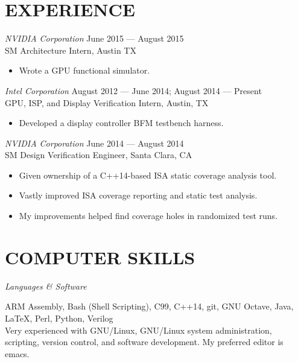 \documentclass[margin]{res}
\begin{document}
\begin{resume}
  \section{EXPERIENCE}
  {\sl NVIDIA Corporation}
  \hfill June 2015 --- August 2015 \\
  SM Architecture Intern, Austin TX
  \vspace{0.25em}
  \begin{itemize}
  \item Wrote a GPU functional simulator.
  \end{itemize}
  {\sl Intel Corporation}
  \hfill August 2012 --- June 2014; August 2014 --- Present \\
  GPU, ISP, and Display Verification Intern, Austin, TX
  \vspace{0.25em}
  \begin{itemize}
  \item Developed a display controller BFM testbench harness.
  \end{itemize}
  {\sl NVIDIA Corporation}
  \hfill June 2014 --- August 2014 \\
  SM Design Verification Engineer, Santa Clara, CA
  \vspace{0.25em}
  \begin{itemize}
  \item Given ownership of a C++14-based ISA static coverage analysis
    tool.
  \item Vastly improved ISA coverage reporting and static test
    analysis.
  \item My improvements helped find coverage holes in randomized test
    runs.
  \end{itemize}

  \section{COMPUTER SKILLS}
  {\sl Languages \& Software} \\
  \vspace{-1.0em}
  \begin{adjustwidth}{1.5em}{0pt}
    ARM Assembly, Bash (Shell Scripting), C99, C++14, git, GNU Octave,
    Java, \LaTeX, Perl, Python, Verilog
    \vspace{0.5em} \\
    Very experienced with GNU/Linux, GNU/Linux system administration,
    scripting, version control, and software development. My preferred
    editor is emacs.
  \end{adjustwidth}


\end{resume}
\end{document}

